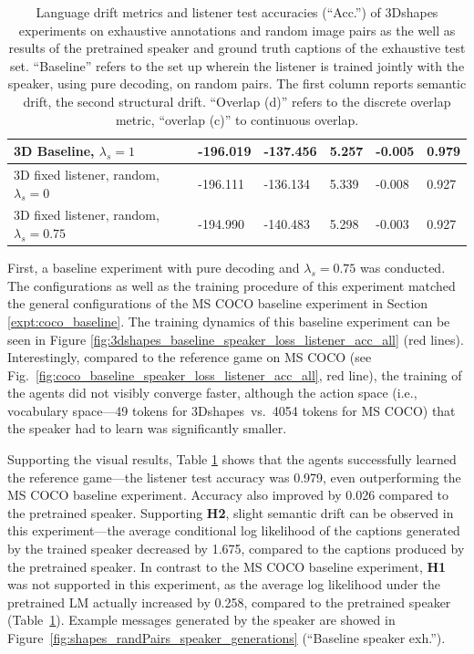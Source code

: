 \begin{table}[]
\begin{tabularx}{\textwidth}{|X|l|l|X|X|X|}
		3D Baseline, $\lambda_s = 1$   &      -196.019             &            -137.456             &        5.257              &          -0.005            &              0.979               \\ \hline
		3D fixed listener, random, $\lambda_s = 0$&      -196.111          &     -136.134                  &             5.339         &         -0.008            &                   0.927              \\ \hline
		3D fixed listener, random, $\lambda_s = 0.75$&      -194.990          &     -140.483                  &             5.298         &         -0.003            &                   0.927             \\ \hline
	\end{tabularx}
	\caption{\label{tab:3dshapes_drift_metrics_basic_baseline}Language drift metrics and listener test accuracies (``Acc.'') of 3Dshapes experiments on exhaustive annotations and random image pairs as the well as results of the pretrained speaker and ground truth captions of the exhaustive test set. ``Baseline'' refers to the set up wherein the listener is trained jointly with the speaker, using pure decoding, on random pairs. The first column reports semantic drift, the second structural drift. ``Overlap (d)'' refers to the discrete overlap metric, ``overlap (c)'' to continuous overlap.}
\end{table}

First, a baseline experiment with pure decoding and $\lambda_s = 0.75$ was conducted.
The configurations as well as the training procedure of this experiment matched the general configurations of the MS COCO baseline experiment in Section \ref{expt:coco_baseline}. The training dynamics of this baseline experiment can be seen in Figure \ref{fig:3dshapes_baseline_speaker_loss_listener_acc_all} (red lines). Interestingly, compared to the reference game on MS COCO (see Fig.~\ref{fig:coco_baseline_speaker_loss_listener_acc_all}, red line), the training of the agents did not visibly converge faster, although the action space (i.e., vocabulary space---49 tokens for 3Dshapes~vs.~4054 tokens for MS COCO) that the speaker had to learn was significantly smaller. 
 
Supporting the visual results, Table \ref{tab:3dshapes_drift_metrics_basic_baseline} shows that the agents successfully learned the reference game---the listener test accuracy was 0.979, even outperforming the MS COCO baseline experiment. Accuracy also improved by 0.026 compared to the pretrained speaker. 
Supporting \textbf{H2}, slight semantic drift can be observed in this experiment---the average conditional log likelihood of the captions generated by the trained speaker decreased by 1.675, compared to the captions produced by the pretrained speaker. In contrast to the MS COCO baseline experiment, \textbf{H1} was not supported in this experiment, as the average log likelihood under the pretrained LM actually increased by 0.258, compared to the pretrained speaker (Table~\ref{tab:3dshapes_drift_metrics_basic_baseline}). Example messages generated by the speaker are showed in Figure~\ref{fig:shapes_randPairs_speaker_generations} (``Baseline speaker exh.'').

